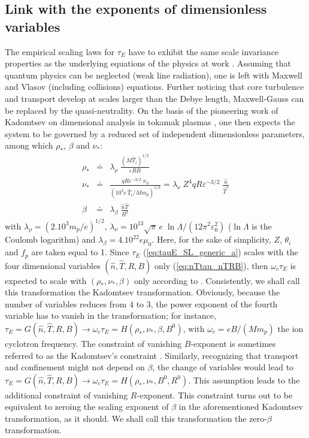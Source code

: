 \documentclass[12pt]{iopart}
\begin{document}
\subsection{Link with the exponents of dimensionless variables} \label{subsec:dimensionless}

The empirical scaling laws for $\tau_E$ have to exhibit the same scale invariance properties as the underlying equations of the physics at work \cite{Connor1977,Luce2008}. Assuming that quantum physics can be neglected (weak line radiation), one is left with Maxwell and Vlasov (including collisions) equations. Further noticing that core turbulence and transport develop at scales larger than the Debye length, Maxwell-Gauss can be replaced by the quasi-neutrality. On the basis of the pioneering work of Kadomtsev on dimensional analysis in tokamak plasmas \cite{Kadomtsev1975}, one then expects the system to be governed by a reduced set of independent dimensionless parameters, among which $\rho_*$, $\beta$ and $\nu_*$:
\begin{eqnarray}
\rho_*  &\doteq& \lambda_\rho\; \frac{(M \widehat T_i)^{1/2}}{\varepsilon R B} 
\label{eq:rhostar}\\
\nu_*   &\doteq& \frac{qR \varepsilon^{-3/2} \; \nu_{ii}}{(10^3e\, \widehat T_i/M m_p)^{1/2}}
= \lambda_\nu \; 
Z^4 qR \varepsilon^{-3/2}\; \frac{\widehat n}{\widehat T^2} 
\label{eq:nustar} \\
\beta   &\doteq& \lambda_\beta\; \frac{\widehat n\widehat T}{B^2} 
\label{eq:beta}
\end{eqnarray}
with $\lambda_\rho = (2.10^3 m_p/e)^{1/2}$, $\lambda_\nu = 10^{13}\sqrt{\pi}\,e\; \ln\Lambda/(12\pi^2\varepsilon_0^2)$ ($\ln\Lambda$ is the Coulomb logarithm) and $\lambda_\beta = 4.10^{22}e\mu_0$. Here, for the sake of simplicity, $Z$, $\theta_i$ and $f_p$ are taken equal to 1.
Since $\tau_E$ (\ref{eq:tauE_SL_generic_a}) scales with the four dimensional variables $(\widehat n, \widehat T, R, B)$ only (\ref{eq:nTtau_nTRB}), then $\omega_c \tau_E$ is expected to scale with $(\rho_*, \nu_*, \beta)$ only according to \cite{Kadomtsev1975}. Consistently, we shall call this transformation the Kadomtsev transformation. Obviously, because the number of variables reduces from 4 to 3, the power exponent of the fourth variable has to vanish in the transformation; for instance, $\tau_E = G(\widehat n, \widehat T, R, B) \to \omega_c \tau_E = H(\rho_*, \nu_*, \beta, B^0)$, with $\omega_c = eB/(M m_p)$ the ion cyclotron frequency. The constraint of vanishing $B$-exponent is sometimes referred to as the Kadomtsev's constraint \cite{Christiansen1991}. Similarly, recognizing that transport and confinement might not depend on $\beta$, the change of variables would lead to $\tau_E = G(\widehat n, \widehat T, R, B) \to \omega_c \tau_E = H(\rho_*, \nu_*, B^0, R^0)$. This assumption leads to the additional constraint of vanishing $R$-exponent. This constraint turns out to be equivalent to zeroing the scaling exponent of $\beta$ in the aforementioned Kadomtsev transformation, as it should. We shall call this transformation the zero-$\beta$ transformation.
\end{document}
